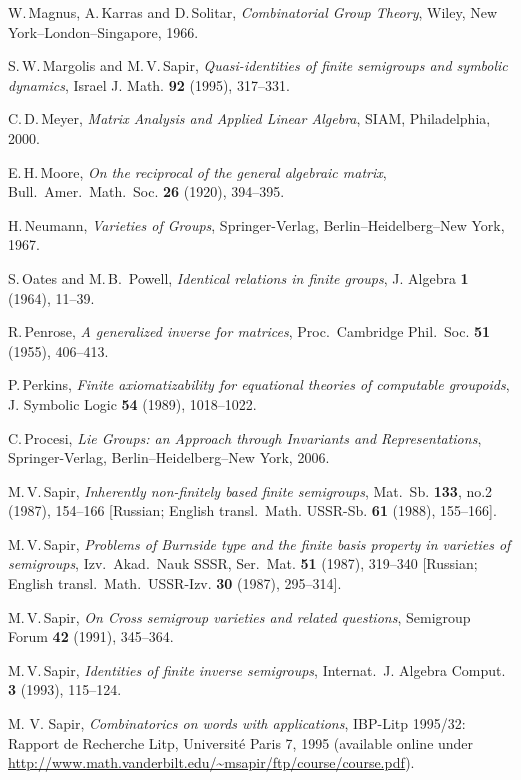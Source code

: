 \documentclass[11pt,reqno]{amsart}
\numberwithin{equation}{section}
\theoremstyle{remark}
\begin{document}
\begin{thebibliography}{99}
W.\,Magnus, A.\,Karras and D.\,Solitar, \emph{Combinatorial Group
Theory}, Wiley, New York--London--Singapore, 1966.

S.\,W.\,Margolis and M.\,V.\,Sapir, \emph{Quasi-identities of
finite semigroups and symbolic dynamics}, Israel J. Math.
\textbf{92} (1995), 317--331.

C.\,D.\,Meyer, \emph{Matrix Analysis and Applied Linear Algebra},
SIAM, Philadelphia, 2000.

E.\,H.\,Moore, \emph{On the reciprocal of the general  algebraic
matrix}, Bull.\ Amer.\ Math.\ Soc. \textbf{26} (1920),  394--395.

H.\,Neumann, \emph{Varieties of Groups}, Springer-Verlag,
Berlin--Heidelberg--New York, 1967.

S.\,Oates and M.\,B.\, Powell, \emph{Identical relations in finite
groups}, J. Algebra  \textbf{1} (1964), 11--39.

R.\,Penrose, \emph{A generalized inverse for matrices}, Proc.\
Cambridge Phil.\ Soc. \textbf{51} (1955), 406--413.

P.\,Perkins, \emph{Finite axiomatizability for equational theories
of computable groupoids}, J. Symbolic Logic \textbf{54} (1989),
1018--1022.

C.\,Procesi, \emph{Lie Groups: an Approach through Invariants and
Representations}, Springer-Verlag, Berlin--Heidelberg--New York,
2006.

M.\,V.\,Sapir, \emph{Inherently non-finitely based finite
semigroups}, Mat.\ Sb. \textbf{133}, no.2 (1987), 154--166
[Russian; English transl.\ Math. USSR-Sb. \textbf{61} (1988),
155--166].

M.\,V.\,Sapir, \emph{Problems of Burnside type and the finite
basis property in varieties of semigroups}, Izv.\ Akad.\ Nauk
SSSR, Ser.\ Mat. \textbf{51} (1987), 319--340 [Russian; English
transl.\ Math.\ USSR-Izv. \textbf{30} (1987), 295--314].

M.\,V.\,Sapir, \emph{On Cross semigroup varieties and related
questions}, Semigroup Forum \textbf{ 42} (1991), 345--364.

M.\,V.\,Sapir, \emph{Identities of finite inverse semigroups},
Internat.\ J. Algebra Comput. \textbf{3} (1993), 115--124.

M. V. Sapir, \emph{Combinatorics on words with applications},
IBP-Litp 1995/32: Rapport de Recherche Litp, Universit\'e Paris 7,
1995 (available online under\\
\url{http://www.math.vanderbilt.edu/~msapir/ftp/course/course.pdf}).


\end{thebibliography}
\end{document}
